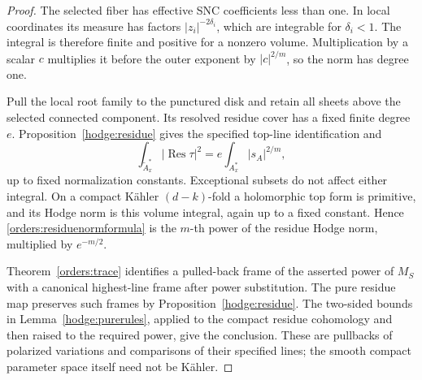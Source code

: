 \begin{proof}
The selected fiber has effective SNC coefficients less than
one.  In local coordinates its measure has factors
\(|z_i|^{-2\delta_i}\), which are integrable for
\(\delta_i<1\).  The integral is therefore finite and positive
for a nonzero volume.  Multiplication by a scalar \(c\)
multiplies it before the outer exponent by \(|c|^{2/m}\),
so the norm has degree one.

Pull the local root family to the punctured disk and retain
all sheets above the selected connected component.  Its
resolved residue cover has a fixed finite degree \(e\).
Proposition~\ref{hodge:residue} gives the specified top-line
identification and
\[
 \int_{\widetilde A_x^*}|\operatorname{Res}\tau|^2
                   =e\int_{A_x^*}|s_A|^{2/m},
\]
up to fixed normalization constants.  Exceptional subsets do
not affect either integral.  On a compact K\"ahler
\((d-k)\)-fold a holomorphic top form is primitive, and its
Hodge norm is this volume integral, again up to a fixed
constant.  Hence \eqref{orders:residuenormformula} is the
\(m\)-th power of the residue Hodge norm, multiplied by
\(e^{-m/2}\).

Theorem~\ref{orders:trace} identifies a pulled-back frame of
the asserted power of \(M_S\) with a canonical highest-line
frame after power substitution.  The pure residue map
preserves such frames by Proposition~\ref{hodge:residue}.
The two-sided bounds in Lemma~\ref{hodge:purerules}, applied
to the compact residue cohomology and then raised to the
required power, give the conclusion.  These are pullbacks
of polarized variations and comparisons of their specified
lines; the smooth compact parameter space itself need not
be K\"ahler.
\end{proof}
